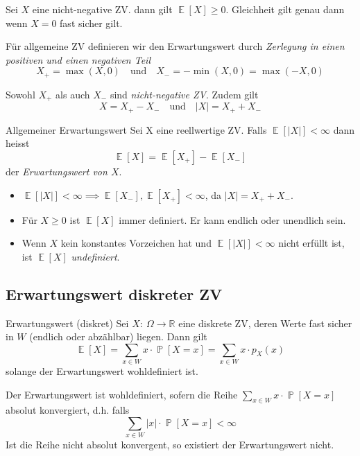 \documentclass[a4paper,10pt]{article}
\def\R{\mathbb{R}}
\renewcommand{\P}{\operatorname{\mathbb{P}}}
\DeclareMathOperator{\E}{\mathbb{E}}
\numberwithin{equation}{section}
\begin{document}
\begin{mainbox}{}
    Sei \( X \) eine nicht-negative ZV. dann gilt \( \E[X] \geq 0 \).
    Gleichheit gilt genau dann wenn \( X = 0 \) fast sicher gilt.
\end{mainbox}

Für allgemeine ZV definieren wir den Erwartungswert durch \emph{Zerlegung in einen positiven und einen negativen Teil}
\[
    X_+ = \max(X, 0) \quad \text{und} \quad X_- = -\min(X, 0) = \max(-X, 0)
\]

Sowohl \( X_+ \) als auch \( X_- \) sind \emph{nicht-negative ZV}.
Zudem gilt
\[
    X = X_+ - X_- \quad \text{und} \quad |X| = X_+ + X_-
\]

\begin{mainbox}{Allgemeiner Erwartungswert}
    Sei X eine reellwertige ZV. Falls \( \E[|X|] < \infty \) dann heisst
    \[
        \E[X] = \E[X_+] - \E[X_-]
    \]
    der \emph{Erwartungswert von \( X \)}.
\end{mainbox}

\begin{itemize}
    \item \( \E[|X|] < \infty \implies \E[X_-], \E[X_+] < \infty \), da \( |X| = X_+ + X_- \).
    \item Für \( X \geq 0 \) ist \( \E[X] \) immer definiert. Er kann endlich oder unendlich sein.
    \item Wenn \( X \) kein konstantes Vorzeichen hat und \( \E[|X|] < \infty \) nicht erfüllt ist, ist \( \E[X] \) \emph{undefiniert}.
\end{itemize}

\subsection{Erwartungswert diskreter ZV}

\begin{mainbox}{Erwartungswert (diskret)}
    Sei \( X: \: \Omega \to \R \) eine diskrete ZV, deren Werte fast sicher in \( W \) (endlich oder abzählbar) liegen. Dann gilt
    \[
        \E[X] = \sum_{x \in W} x \cdot \P[X = x] = \sum_{x \in W} x \cdot p_X(x)
    \]
    solange der Erwartungswert wohldefiniert ist.
\end{mainbox}
Der Erwartungswert ist wohldefiniert, sofern die Reihe \( \sum_{x \in W} x \cdot \P[X = x] \) absolut konvergiert, d.h. falls
\[
    \sum_{x \in W} |x| \cdot \P[X = x] < \infty
\]
Ist die Reihe nicht absolut konvergent, so existiert der Erwartungswert nicht.
\end{document}
